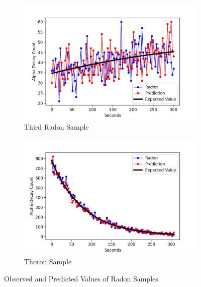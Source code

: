 \documentclass[11pt]{m2pi}
\begin{document}
\vspace*{-0.45cm}
\begin{figure}[h]\ContinuedFloat
        \centering
        \begin{subfigure}[c]{0.475\textwidth}   
            \centering 
            \includegraphics[scale=0.425]{images/Radon_Trial3.png}
            \caption[]%
            {{\tiny Third Radon Sample}}    
            \label{fig:RadonTrial3}
        \end{subfigure}
        \begin{subfigure}[c]{0.475\textwidth}   
            \centering 
            \includegraphics[scale=0.425]{images/Thoron_Trial1.png}
            \caption[]%
            {{\tiny Thoron Sample}}    
            \label{fig:ThoronTrial}
        \end{subfigure}
        \caption[ The average and standard deviation of critical parameters ]
        {\tiny Observed and Predicted Values of Radon Samples} 
        \label{fig:RealWorldTests}
\end{figure}
\end{document}
